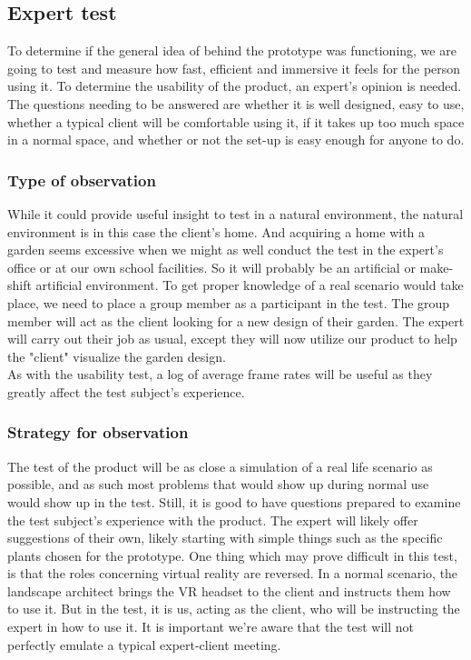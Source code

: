 \subsection{Expert test}
To determine if the general idea of behind the prototype was functioning, we are going to test and measure how fast, efficient and immersive it feels for the person using it.
To determine the usability of the product, an expert's opinion is needed. The questions needing to be answered are whether it is well designed, easy to use, whether a typical client will be comfortable using it, if it takes up too much space in a normal space, and whether or not the set-up is easy enough for anyone to do.
\subsubsection{Type of observation}
While it could provide useful insight to test in a natural environment, the natural environment is in this case the client's home. And acquiring a home with a garden seems excessive when we might as well conduct the test in the expert's office or at our own school facilities. So it will probably be an artificial or make-shift artificial environment. To get proper knowledge of a real scenario would take place, we need to place a group member as a participant in the test. The group member will act as the client looking for a new design of their garden. The expert will carry out their job as usual, except they will now utilize our product to help the "client" visualize the garden design.\\
As with the usability test, a log of average frame rates will be useful as they greatly affect the test subject's experience. 

\subsubsection{Strategy for observation}
The test of the product will be as close a simulation of a real life scenario as possible, and as such most problems that would show up during normal use would show up in the test. Still, it is good to have questions prepared to examine the test subject's experience with the product. The expert will likely offer suggestions of their own, likely starting with simple things such as the specific plants chosen for the prototype. 
One thing which may prove difficult in this test, is that the roles concerning virtual reality are reversed. In a normal scenario, the landscape architect brings the VR headset to the client and instructs them how to use it. But in the test, it is us, acting as the client, who will be instructing the expert in how to use it. It is important we're aware that the test will not perfectly emulate a typical expert-client meeting. 

